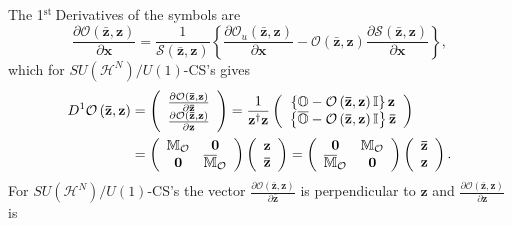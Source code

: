 \documentclass[aps,preprint]{revtex4}%
\begin{document}
The 1$^{\text{st }}$Derivatives of the symbols are
\begin{equation}
\frac{\partial\mathcal{O}\left(  \mathbf{\bar{z},z}\right)  }{\partial
\mathbf{x}}=\frac{1}{\mathcal{S}\left(  \mathbf{\bar{z},z}\right)  }\left\{
\frac{\partial\mathcal{O}_{u}\left(  \mathbf{\bar{z},z}\right)  }%
{\partial\mathbf{x}}-\mathcal{O}\left(  \mathbf{\bar{z},z}\right)
\frac{\partial\mathcal{S}\left(  \mathbf{\bar{z},z}\right)  }{\partial
\mathbf{x}}\right\}  ,
\end{equation}
which for $SU\left(  \mathcal{H}^{N}\right)  /U\left(  1\right)  $-CS's gives%
\begin{align}
D^{1}\mathcal{O}\left(  \mathbf{\bar{z},z}\right)   &  =\left(
\begin{array}
[c]{c}%
\frac{\partial\mathcal{O}\left(  \mathbf{\bar{z},z}\right)  }{\partial
\mathbf{\bar{z}}}\\
\frac{\partial\mathcal{O}\left(  \mathbf{\bar{z},z}\right)  }{\partial
\mathbf{z}}%
\end{array}
\right)  =\frac{1}{\mathbf{z}^{\dagger}\mathbf{z}}\left(
\begin{array}
[c]{c}%
\left\{  \mathbb{O}-\mathcal{O}\left(  \mathbf{\bar{z},z}\right)
\mathbb{I}\right\}  \mathbf{z}\\
\left\{  \overline{\mathbb{O}}-\mathcal{O}\left(  \mathbf{\bar{z},z}\right)
\mathbb{I}\right\}  \mathbf{\bar{z}}%
\end{array}
\right) \\
&  =\left(
\begin{array}
[c]{cc}%
\mathbb{M}_{\mathcal{O}} & \mathbf{0}\\
\mathbf{0} & \overline{\mathbb{M}}_{\mathcal{O}}%
\end{array}
\right)  \left(
\begin{array}
[c]{c}%
\mathbf{z}\\
\mathbf{\bar{z}}%
\end{array}
\right)  =\left(
\begin{array}
[c]{cc}%
\mathbf{0} & \mathbb{M}_{\mathcal{O}}\\
\overline{\mathbb{M}}_{\mathcal{O}} & \mathbf{0}%
\end{array}
\right)  \left(
\begin{array}
[c]{c}%
\mathbf{\bar{z}}\\
\mathbf{z}%
\end{array}
\right)  .
\end{align}
For $SU\left(  \mathcal{H}^{N}\right)  /U\left(  1\right)  $-CS's the vector
$\frac{\partial\mathcal{O}\left(  \mathbf{\bar{z},z}\right)  }{\partial
\mathbf{\bar{z}}}$ is perpendicular to $\mathbf{z}$ and $\frac{\partial
\mathcal{O}\left(  \mathbf{\bar{z},z}\right)  }{\partial\mathbf{z}}$ is
\end{document}
